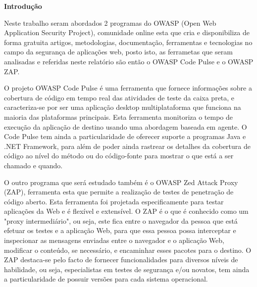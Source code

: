 \begin{center}
\normalsize{\bfseries Introdução}\hfill 
\par Neste trabalho seram abordados 2 programas do OWASP (Open Web Application Security Project), comunidade online esta que cria e disponibiliza de forma gratuita artigos, metodologias, documentação, ferramentas e tecnologias no campo da segurança de aplicações web, posto isto, as ferrametas que seram analisadas e referidas neste relatório são então o OWASP Code Pulse e o OWASP ZAP.

\par O projeto OWASP Code Pulse é uma ferramenta que fornece informações sobre a cobertura de código em tempo real das atividades de teste da caixa preta, e caracteriza-se por ser uma aplicação desktop multiplataforma que funciona na maioria das plataformas principais. Esta ferramenta monitoriza o tempo de execução da aplicação de destino usando uma abordagem baseada em agente. O Code Pulse tem ainda a particularidade de oferecer suporte a programas Java e .NET Framework, para além de poder ainda rastrear os detalhes da cobertura de código ao nível do método ou do código-fonte para mostrar o que está a ser chamado e quando. 

\par O outro programa que será estudado também é o OWASP Zed Attack Proxy (ZAP), ferramenta esta que permite a realização de testes de penetração de código aberto. Esta ferramenta foi projetada especificamente para testar aplicações da Web e é flexível e extensível. O ZAP é o que é conhecido como um "proxy intermediário", ou seja, este fica entre o navegador da pessoa que está efetuar os testes e a aplicação Web, para que essa pessoa possa interceptar e inspecionar as mensagens enviadas entre o navegador e o aplicação Web, modificar o conteúdo, se necessário, e encaminhar esses pacotes para o destino. O ZAP destaca-se pelo facto de fornecer funcionalidades para diversos níveis de habilidade, ou seja, especialistas em testes de segurança e/ou novatos, tem ainda a particularidade de possuir versões para cada sistema operacional.

\end{center}







